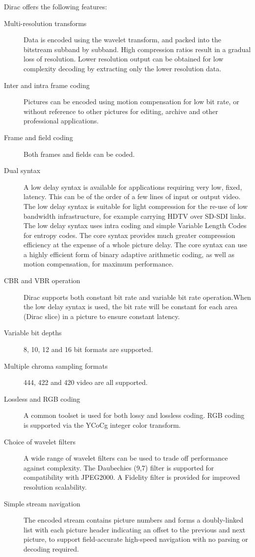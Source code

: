 Dirac offers the following features:
\begin{description}
\item[Multi-resolution transforms] Data is encoded using the wavelet transform, 
and packed into the bitstream subband by subband. High compression ratios result 
in a gradual loss of resolution. Lower resolution output can be obtained 
for low complexity decoding by extracting only the lower resolution data.
\item[Inter and intra frame coding] Pictures can be encoded using motion compensation
for low bit rate, or without reference to other pictures for editing, archive
and other professional applications.
\item[Frame and field coding] Both frames and fields can be coded.
\item[Dual syntax] A low delay syntax is available for applications requiring 
very low, fixed, latency. This can be of the order of a few lines of input 
or output video. The low delay syntax is suitable for light compression 
for the re-use of low bandwidth infrastructure, for example carrying 
HDTV over SD-SDI links. The low delay syntax uses 
intra coding and simple Variable Length 
Codes for entropy codes. The core syntax provides much greater compression efficiency 
at the expense of a whole picture delay. The core syntax can use a highly efficient 
form of binary adaptive arithmetic coding, as well as motion compensation, 
for maximum performance.
\item[CBR and VBR operation] Dirac supports both constant bit rate and 
variable bit rate operation.When the low delay syntax is used, the bit 
rate will be constant for each area (Dirac slice) in a picture to 
ensure constant latency.
\item[Variable bit depths] 8, 10, 12 and 16 bit formats are supported.
\item[Multiple chroma sampling formats] 444, 422 and 420 video are all supported.
\item[Lossless and RGB coding] A common toolset is used for both lossy and lossless 
coding. RGB coding is supported via the YCoCg integer color transform.
\item[Choice of wavelet filters] A wide range of wavelet filters can be used 
to trade off performance against complexity. The Daubechies (9,7) filter is 
supported for compatibility with JPEG2000. A Fidelity filter is provided for 
improved resolution scalability.
\item[Simple stream navigation] The encoded stream contains picture numbers and 
forms a doubly-linked list with each picture header indicating an offset to 
the previous and next picture, to support field-accurate high-speed navigation
with no parsing or decoding required.
\end{description}
